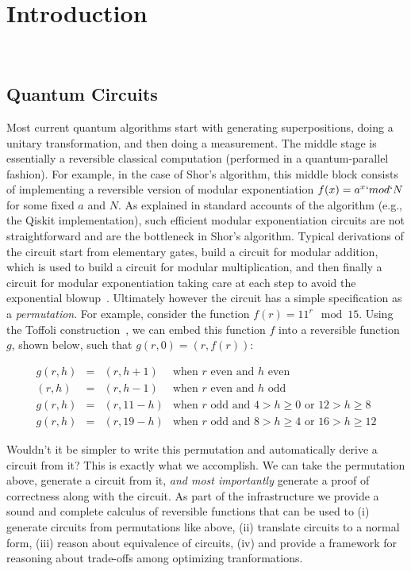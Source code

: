 \section{Introduction}~\label{sec:introduction}


\subsection*{Quantum Circuits}

Most current quantum algorithms start with generating superpositions, doing a unitary transformation, and then doing a measurement. The middle stage is essentially a reversible classical computation (performed in a quantum-parallel fashion). For example, in the case of Shor's algorithm, this middle block consists of implementing a reversible version of modular exponentiation $f(x) = a^x `mod` N$ for some fixed $a$ and $N$. As explained in standard accounts of the algorithm (e.g., the Qiskit implementation), such efficient modular exponentiation circuits are not straightforward and are the bottleneck in Shor’s algorithm. Typical derivations of the circuit start from elementary gates, build a circuit for modular addition, which is used to build a circuit for modular multiplication, and then finally a circuit for modular exponentiation taking care at each step to avoid the exponential blowup~\cite{shorefficient}. Ultimately however the circuit has a simple specification as a \emph{permutation}. For example, consider the function $f(r) = 11^{r} \mod 15$. Using the Toffoli construction~\cite{Toffoli:1980}, we can embed this function $f$ into a reversible function $g$, shown below, such that $g(r,0) = (r,f(r))$:

\[\begin{array}{rcll}
    g(r,h) & = & (r,h+1)  & \mbox{when~$r$~even~and~$h$~even}                          \\
    (r,h)  & = & (r,h-1)  & \mbox{when~$r$~even~and~$h$~odd}                           \\
    g(r,h) & = & (r,11-h) & \mbox{when~$r$~odd~and~$4 > h \geq 0$~or~$12 > h \geq 8$}  \\
    g(r,h) & = & (r,19-h) & \mbox{when~$r$~odd~and~$8 > h \geq 4$~or~$16 > h \geq 12$}
  \end{array}\]

Wouldn't it be simpler to write this permutation and automatically derive a circuit from it? This is exactly what we accomplish. We can take the permutation above, generate a circuit from it, \emph{and most importantly} generate a proof of correctness along with the circuit. As part of the infrastructure we provide a sound and complete calculus of reversible functions that can be used to (i) generate circuits from permutations like above, (ii) translate circuits to a normal form, (iii) reason about equivalence of circuits, (iv) and provide a framework for reasoning about trade-offs among optimizing tranformations.

